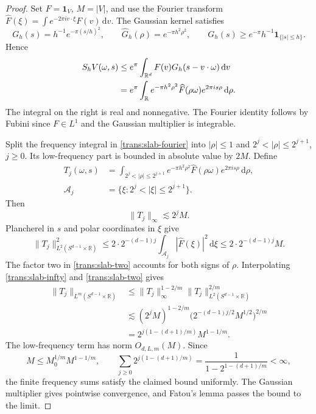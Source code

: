\documentclass[11pt]{article}
\numberwithin{equation}{section}
\newcommand{\R}{\mathbb{R}}
\newcommand{\dd}{\,\mathrm{d}}
\newcommand{\norm}[1]{\lVert #1\rVert}
\begin{document}
\begin{proof}
Set \(F=\mathbf1_V\), \(M=|V|\), and use the Fourier transform
\(\widehat F(\xi)=\int e^{-2\pi i v\cdot\xi}F(v)\dd v\).
The Gaussian kernel satisfies
\[
 G_h(s)=h^{-1}e^{-\pi(s/h)^2},\qquad
 \widehat G_h(\rho)=e^{-\pi h^2\rho^2},\qquad
 G_h(s)\geq e^{-\pi}h^{-1}\mathbf1_{\{|s|\leq h\}}.
\]
Hence
\begin{align}
 S_hV(\omega,s)
 &\leq e^\pi\int_{\R^d}F(v)G_h(s-v\cdot\omega)\dd v\notag\\
 &=e^\pi\int_{\R}e^{-\pi h^2\rho^2}
           \widehat F(\rho\omega)e^{2\pi i s\rho}\dd\rho.
 \label{trans:slab-fourier}
\end{align}
The integral on the right is real and nonnegative. The Fourier
identity follows by Fubini since \(F\in L^1\) and the Gaussian
multiplier is integrable.

Split the frequency integral in \eqref{trans:slab-fourier} into \(|\rho|\leq1\) and
\(2^j<|\rho|\leq2^{j+1}\), \(j\geq0\). Its low-frequency part
is bounded in absolute value by \(2M\). Define
\begin{align*}
 T_j(\omega,s)
 &=\int_{2^j<|\rho|\leq2^{j+1}}
       e^{-\pi h^2\rho^2}\widehat F(\rho\omega)e^{2\pi i s\rho}\dd\rho,\\
 \mathcal A_j&=\{\xi:2^j<|\xi|\leq2^{j+1}\}.
\end{align*}
Then
\begin{equation}\label{trans:slab-infty}
 \norm{T_j}_\infty\lesssim 2^jM.
\end{equation}
Plancherel in \(s\) and polar coordinates in \(\xi\) give
\begin{equation}\label{trans:slab-two}
 \norm{T_j}_{L^2(S^{d-1}\times\R)}^2
 \leq 2\cdot2^{-(d-1)j}
       \int_{\mathcal A_j}|\widehat F(\xi)|^2\dd\xi
 \leq2\cdot2^{-(d-1)j}M.
\end{equation}
The factor two in \eqref{trans:slab-two} accounts for both signs of
\(\rho\). Interpolating \eqref{trans:slab-infty} and
\eqref{trans:slab-two} gives
\begin{align*}
 \norm{T_j}_{L^m(S^{d-1}\times\R)}
 &\leq \norm{T_j}_\infty^{1-2/m}
        \norm{T_j}_{L^2(S^{d-1}\times\R)}^{2/m}\\
 &\lesssim (2^jM)^{1-2/m}
       \bigl(2^{-(d-1)j/2}M^{1/2}\bigr)^{2/m}\\
 &=2^{j(1-(d+1)/m)}M^{1-1/m}.
\end{align*}
The low-frequency term has norm \(O_{d,L,m}(M)\). Since
\[
 M\leq M_0^{1/m}M^{1-1/m},\qquad
 \sum_{j\geq0}2^{j(1-(d+1)/m)}
   =\frac{1}{1-2^{1-(d+1)/m}}<\infty,
\]
the finite frequency sums satisfy the claimed bound uniformly.
The Gaussian multiplier gives pointwise convergence, and Fatou's
lemma passes the bound to the limit.
\end{proof}
\end{document}
